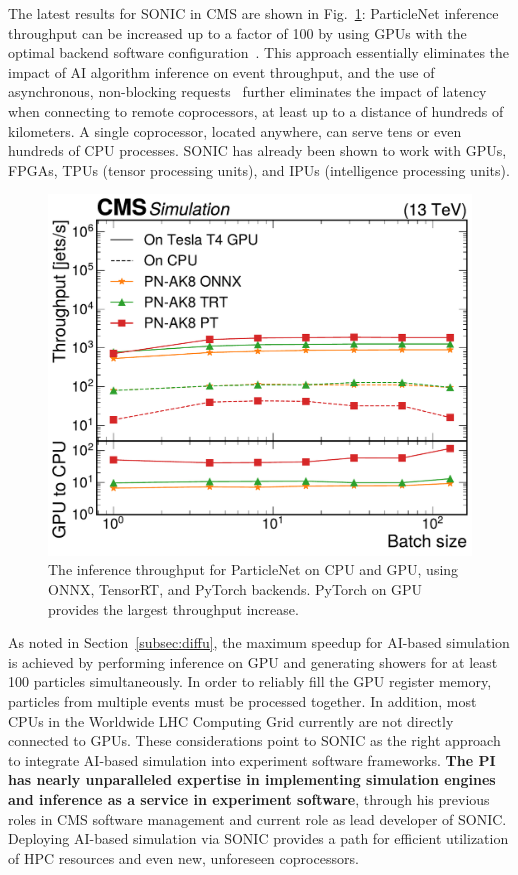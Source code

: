 The latest results for SONIC in CMS are shown in Fig.~\ref{fig:sonic}:
ParticleNet inference throughput can be increased up to a factor of 100 by using GPUs with the optimal backend software configuration~\cite{CMS:2024twn}.
This approach essentially eliminates the impact of AI algorithm inference on event throughput,
and the use of asynchronous, non-blocking requests~\cite{Bocci:2020olh} further eliminates the impact of latency when connecting to remote coprocessors,
at least up to a distance of hundreds of kilometers.
A single coprocessor, located anywhere, can serve tens or even hundreds of CPU processes.
SONIC has already been shown to work with GPUs, FPGAs, TPUs (tensor processing units), and IPUs (intelligence processing units).

\begin{figure}
\centering
\includegraphics[width=0.49\myfigurewidth]{figures/CMS-MLG-23-001_Figure_005-b.pdf}
\caption{The inference throughput for ParticleNet on CPU and GPU, using ONNX, TensorRT, and PyTorch backends. PyTorch on GPU provides the largest throughput increase.}
\label{fig:sonic}
\end{figure}

As noted in Section~\ref{subsec:diffu}, the maximum speedup for AI-based simulation is achieved by performing inference on GPU
and generating showers for at least 100 particles simultaneously.
In order to reliably fill the GPU register memory, particles from multiple events must be processed together.
In addition, most CPUs in the Worldwide LHC Computing Grid currently are not directly connected to GPUs.
These considerations point to SONIC as the right approach to integrate AI-based simulation into experiment software frameworks.
\textbf{The PI has nearly unparalleled expertise in implementing simulation engines and inference as a service in experiment software},
through his previous roles in CMS software management and current role as lead developer of SONIC.
Deploying AI-based simulation via SONIC provides a path for efficient utilization of HPC resources and even new, unforeseen coprocessors.

